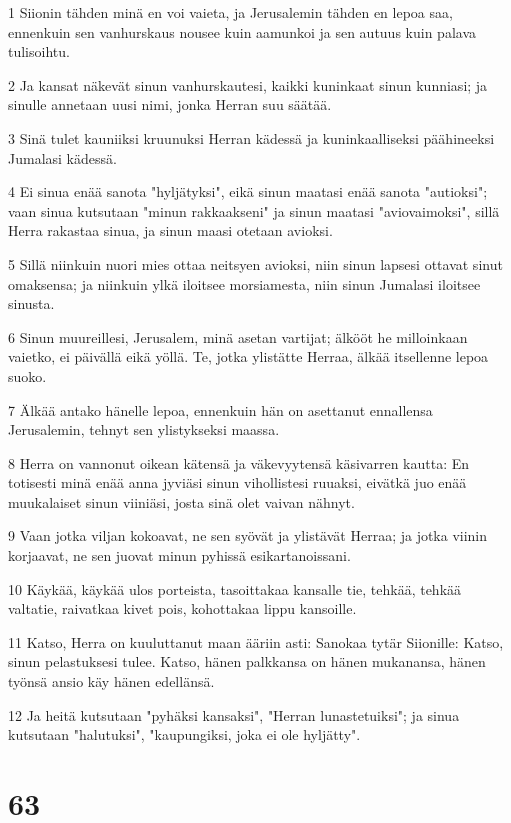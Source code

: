 \par 1 Siionin tähden minä en voi vaieta, ja Jerusalemin tähden en lepoa saa, ennenkuin sen vanhurskaus nousee kuin aamunkoi ja sen autuus kuin palava tulisoihtu.
\par 2 Ja kansat näkevät sinun vanhurskautesi, kaikki kuninkaat sinun kunniasi; ja sinulle annetaan uusi nimi, jonka Herran suu säätää.
\par 3 Sinä tulet kauniiksi kruunuksi Herran kädessä ja kuninkaalliseksi päähineeksi Jumalasi kädessä.
\par 4 Ei sinua enää sanota "hyljätyksi", eikä sinun maatasi enää sanota "autioksi"; vaan sinua kutsutaan "minun rakkaakseni" ja sinun maatasi "aviovaimoksi", sillä Herra rakastaa sinua, ja sinun maasi otetaan avioksi.
\par 5 Sillä niinkuin nuori mies ottaa neitsyen avioksi, niin sinun lapsesi ottavat sinut omaksensa; ja niinkuin ylkä iloitsee morsiamesta, niin sinun Jumalasi iloitsee sinusta.
\par 6 Sinun muureillesi, Jerusalem, minä asetan vartijat; älkööt he milloinkaan vaietko, ei päivällä eikä yöllä. Te, jotka ylistätte Herraa, älkää itsellenne lepoa suoko.
\par 7 Älkää antako hänelle lepoa, ennenkuin hän on asettanut ennallensa Jerusalemin, tehnyt sen ylistykseksi maassa.
\par 8 Herra on vannonut oikean kätensä ja väkevyytensä käsivarren kautta: En totisesti minä enää anna jyviäsi sinun vihollistesi ruuaksi, eivätkä juo enää muukalaiset sinun viiniäsi, josta sinä olet vaivan nähnyt.
\par 9 Vaan jotka viljan kokoavat, ne sen syövät ja ylistävät Herraa; ja jotka viinin korjaavat, ne sen juovat minun pyhissä esikartanoissani.
\par 10 Käykää, käykää ulos porteista, tasoittakaa kansalle tie, tehkää, tehkää valtatie, raivatkaa kivet pois, kohottakaa lippu kansoille.
\par 11 Katso, Herra on kuuluttanut maan ääriin asti: Sanokaa tytär Siionille: Katso, sinun pelastuksesi tulee. Katso, hänen palkkansa on hänen mukanansa, hänen työnsä ansio käy hänen edellänsä.
\par 12 Ja heitä kutsutaan "pyhäksi kansaksi", "Herran lunastetuiksi"; ja sinua kutsutaan "halutuksi", "kaupungiksi, joka ei ole hyljätty".

\chapter{63}

